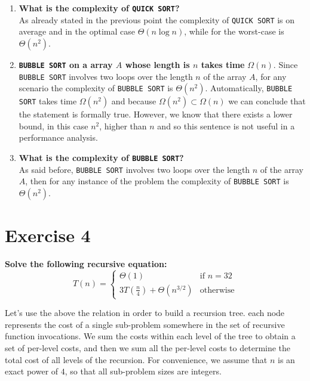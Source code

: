 \documentclass{article}
\begin{document}
\begin{enumerate}[label=(\alph*)]
		\item \textbf{What is the complexity of \texttt{QUICK SORT}?}\\
		As already stated in the previous point the complexity of \texttt{QUICK SORT} is on average and in the optimal case $\Theta(n\log n)$, while for the worst-case is $\Theta(n^2)$.
		\item \textbf{\texttt{BUBBLE SORT} on a array $A$ whose length is $n$ takes time} $\Omega(n)$.
		Since \texttt{BUBBLE SORT} involves two loops over the length $n$ of the array $A$, for any scenario the complexity of \texttt{BUBBLE SORT} is $\Theta(n^2)$. Automatically, \texttt{BUBBLE SORT} takes time $\Omega(n^2)$ and because $\Omega(n^2) \subset \Omega(n) $ we can conclude that the statement is formally true. However, we know that there exists a lower bound, in this case $n^2$, higher than $n$ and so this sentence is not useful in a performance analysis. 
		\item  \textbf{What is the complexity of \texttt{BUBBLE SORT}?} \\
		As said before,  \texttt{BUBBLE SORT} involves two loops over the length $n$ of the array $A$, then for any instance of the problem the complexity of \texttt{BUBBLE SORT} is $\Theta(n^2)$. 
	\end{enumerate}

	\section*{Exercise 4}
	\textbf{Solve the following recursive equation:}
	$$
	T(n) = \begin{cases}
			\Theta(1) & \text{if } n= 32 \\
			3T(\frac{n}{4}) + \Theta(n^{3/2}) & \text{otherwise}
			\end{cases} 
	$$
	
	\noindent Let's use the above the relation in order to build a recursion tree.  each node represents the cost of a single sub-problem somewhere in the set of recursive function invocations. We sum the costs within each level of the tree to obtain a set of per-level costs, and then we sum all the per-level costs to determine the total cost of all levels of the recursion. For convenience, we assume that $n$ is an exact power of $4$, so that all sub-problem sizes are integers. \\
	
\end{document}
